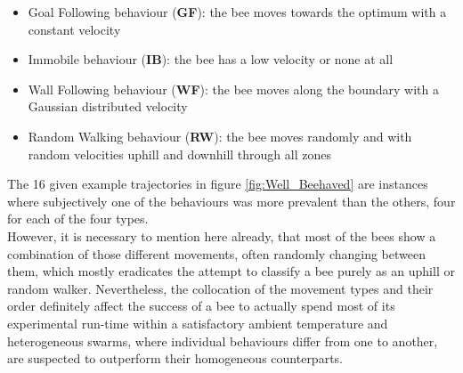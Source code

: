 \begin{itemize}
    \item Goal Following behaviour (\textbf{GF}): the bee moves towards the optimum with a constant velocity
    \item Immobile behaviour (\textbf{IB}): the bee has a low velocity or none at all
    \item Wall Following behaviour (\textbf{WF}): the bee moves along the boundary with a Gaussian distributed velocity
    \item Random Walking behaviour (\textbf{RW}): the bee moves randomly and with random velocities uphill and downhill through all zones 
\end{itemize}

The 16 given example trajectories in figure \ref{fig:Well_Beehaved} are instances where subjectively one of the behaviours was more prevalent than the others, four for each of the four types.
\\
However, it is necessary to mention here already, that most of the bees show a combination of those different movements, often randomly changing between them, which mostly eradicates the attempt to classify a bee purely as an uphill or random walker. Nevertheless, the collocation of the movement types and their order definitely affect the success of a bee to actually spend most of its experimental run-time within a satisfactory ambient temperature and heterogeneous swarms, where individual behaviours differ from one to another, are suspected to outperform their homogeneous counterparts. \cite{Kengyel2015} 

